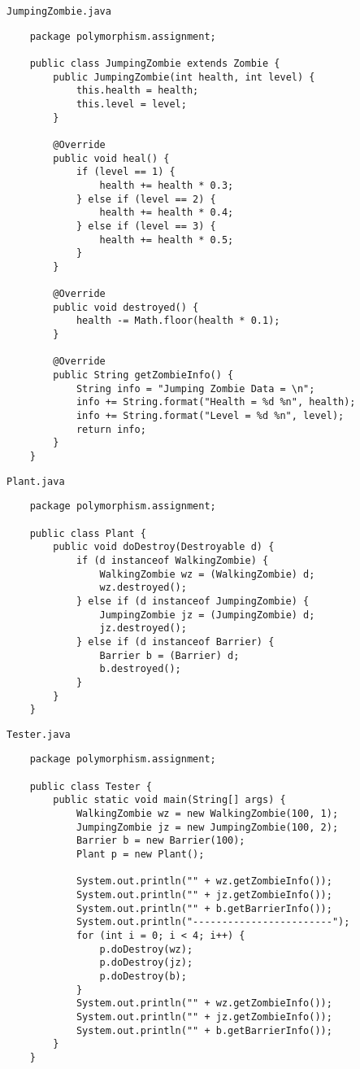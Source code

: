 \documentclass[12pt,titlepage]{article}
\begin{document}
\texttt{JumpingZombie.java}
\begin{verbatim}
    package polymorphism.assignment;

    public class JumpingZombie extends Zombie {
        public JumpingZombie(int health, int level) {
            this.health = health;
            this.level = level;
        }

        @Override
        public void heal() {
            if (level == 1) {
                health += health * 0.3;
            } else if (level == 2) {
                health += health * 0.4;
            } else if (level == 3) {
                health += health * 0.5;
            }
        }

        @Override
        public void destroyed() {
            health -= Math.floor(health * 0.1);
        }

        @Override
        public String getZombieInfo() {
            String info = "Jumping Zombie Data = \n";
            info += String.format("Health = %d %n", health);
            info += String.format("Level = %d %n", level);
            return info;
        }
    }
\end{verbatim}

\texttt{Plant.java}
\begin{verbatim}
    package polymorphism.assignment;

    public class Plant {
        public void doDestroy(Destroyable d) {
            if (d instanceof WalkingZombie) {
                WalkingZombie wz = (WalkingZombie) d;
                wz.destroyed();
            } else if (d instanceof JumpingZombie) {
                JumpingZombie jz = (JumpingZombie) d;
                jz.destroyed();
            } else if (d instanceof Barrier) {
                Barrier b = (Barrier) d;
                b.destroyed();
            }
        }
    }
\end{verbatim}

\texttt{Tester.java}
\begin{verbatim}
    package polymorphism.assignment;

    public class Tester {
        public static void main(String[] args) {
            WalkingZombie wz = new WalkingZombie(100, 1);
            JumpingZombie jz = new JumpingZombie(100, 2);
            Barrier b = new Barrier(100);
            Plant p = new Plant();

            System.out.println("" + wz.getZombieInfo());
            System.out.println("" + jz.getZombieInfo());
            System.out.println("" + b.getBarrierInfo());
            System.out.println("------------------------");
            for (int i = 0; i < 4; i++) {
                p.doDestroy(wz);
                p.doDestroy(jz);
                p.doDestroy(b);
            }
            System.out.println("" + wz.getZombieInfo());
            System.out.println("" + jz.getZombieInfo());
            System.out.println("" + b.getBarrierInfo());
        }
    }
\end{verbatim}
\end{document}
